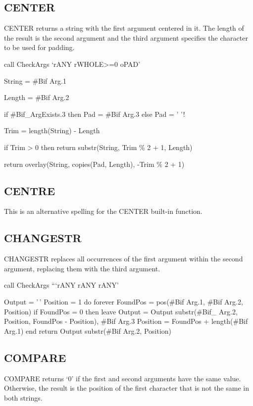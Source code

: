 \subsection{CENTER}\label{center}

CENTER returns a string with the first argument centered in it. The
length of the result is the second argument and the third argument
specifies the character to be used for padding.

call CheckArgs `rANY rWHOLE\textgreater=0 oPAD'

String = \#Bif Arg.1

Length = \#Bif Arg.2

if \#Bif\_ArgExists.3 then Pad = \#Bif Arg.3 else Pad = ' '!

Trim = length(String) - Length

if Trim \textgreater{} 0 then return substr(String, Trim \% 2 + 1,
Length)

return overlay(String, copies(Pad, Length), -Trim \% 2 + 1)

\subsection{CENTRE}\label{centre}

This is an alternative spelling for the CENTER built-in function.

\subsection{CHANGESTR}\label{changestr}

CHANGESTR replaces all occurrences of the first argument within the
second argument, replacing them with the third argument.

call CheckArgs ```rANY rANY rANY'

Output = '\,' Position = 1 do forever FoundPos = pos(\#Bif Arg.1, \#Bif
Arg.2, Position) if FoundPos = 0 then leave Output = Output
\textbar\textbar{} substr(\#Bif\_ Arg.2, Position, FoundPos - Position),
\textbar\textbar{} \#Bif Arg.3 Position = FoundPos + length(\#Bif Arg.1)
end return Output \textbar\textbar{} substr(\#Bif Arg.2, Position)

\subsection{COMPARE}\label{compare}

COMPARE returns `0' if the first and second arguments have the same
value. Otherwise, the result is the position of the first character that
is not the same in both strings.

